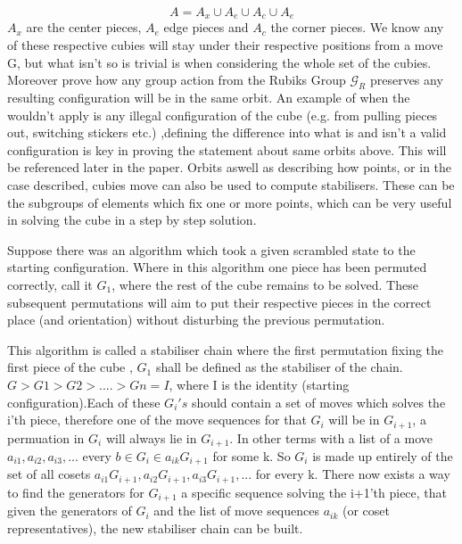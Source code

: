 \documentclass{article}
\begin{document}
\begin{equation}
A = A_{x}\cup A_{e}\cup A_{c}\cup A_{e}
\end{equation} 
$A_{x}$ are the center pieces, $A_{e}$ edge pieces and $A_{c}$ the corner pieces. We know any of these respective cubies will stay under their respective positions from a move G, but what isn't so is trivial is when considering the whole set of the cubies. Moreover prove how any group action from the Rubiks Group $\mathcal{G}_{R}$ preserves any resulting configuration will be in the same orbit.\cite{Harvard} 
An example of when the wouldn't apply is any illegal configuration of the cube (e.g. from pulling pieces out, switching stickers etc.) ,defining the difference into what is and isn't a valid configuration is key in proving the statement about same orbits above. This will be referenced later in the paper.
Orbits aswell as describing how points, or in the case described, cubies move can also be used to compute stabilisers. These can be the subgroups of elements which fix one or more points, which can be very useful in solving the cube in a step by step solution.\cite{PermGroups}

Suppose there was an algorithm which took a given scrambled state to the starting configuration. Where in this algorithm one piece has been permuted correctly, call it $G_{1}$, where the rest of the cube remains to be solved. These subsequent permutations will aim to put their respective pieces in the correct place (and orientation) without disturbing the previous permutation.   

This algorithm is called a stabiliser chain where the first permutation fixing the first piece of the cube , $G_{1}$ shall be defined as the stabiliser of the chain.  $G > G1 > G2 > .... > Gn = I$, where I is the identity (starting configuration).Each of these $G_{i}'s$ should contain a set of moves which solves the i'th piece, therefore one of the move sequences for that $G_{i}$ will be in $G_{i+1}$, a permuation in $G_{i}$ will always lie in $G_{i+1}$. In other terms with a list  of a move $a_{i1},a_{i2},a_{i3}, ...$ every $b \in G_{i} \in a_{ik}G_{i+1}$ for some k. So $G_{i}$ is made up entirely of the set of all cosets $a_{i1}G_{i+1}, a_{i2}G_{i+1}, a_{i3}G_{i+1}, ... $ for every k. There now exists a way to find the generators for $G_{i+1}$ a specific sequence solving the i+1'th piece, that given the generators of $G_{i}$ and the list of move sequences $a_{ik}$ (or coset representatives), the new stabiliser chain can be built.\cite{Schreier}
\end{document}
